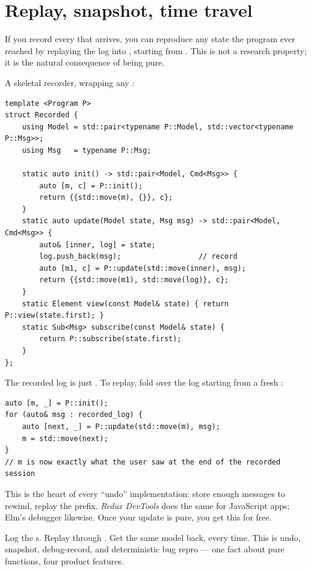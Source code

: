 \section{Replay, snapshot, time travel}
\label{sec:elm:replay}

If you record every  that arrives, you can reproduce any
state the program ever reached by replaying the log into
, starting from . This is not a research
property; it is the natural consequence of  being pure.

A skeletal recorder, wrapping any :

\begin{lstlisting}
template <Program P>
struct Recorded {
    using Model = std::pair<typename P::Model, std::vector<typename P::Msg>>;
    using Msg   = typename P::Msg;

    static auto init() -> std::pair<Model, Cmd<Msg>> {
        auto [m, c] = P::init();
        return {{std::move(m), {}}, c};
    }
    static auto update(Model state, Msg msg) -> std::pair<Model, Cmd<Msg>> {
        auto& [inner, log] = state;
        log.push_back(msg);                  // record
        auto [m1, c] = P::update(std::move(inner), msg);
        return {{std::move(m1), std::move(log)}, c};
    }
    static Element view(const Model& state) { return P::view(state.first); }
    static Sub<Msg> subscribe(const Model& state) {
        return P::subscribe(state.first);
    }
};
\end{lstlisting}

The recorded log is just . To replay, fold
 over the log starting from a fresh :

\begin{lstlisting}
auto [m, _] = P::init();
for (auto& msg : recorded_log) {
    auto [next, _] = P::update(std::move(m), msg);
    m = std::move(next);
}
// m is now exactly what the user saw at the end of the recorded session
\end{lstlisting}

This is the heart of every ``undo'' implementation: store enough
messages to rewind, replay the prefix. \emph{Redux DevTools} does the
same for JavaScript apps; Elm's debugger likewise. Once your update
is pure, you get this for free.

\begin{idea}
Log the s. Replay through . Get the same
model back, every time. This is undo, snapshot, debug-record, and
deterministic bug repro --- one fact about pure functions, four
product features.
\end{idea}

